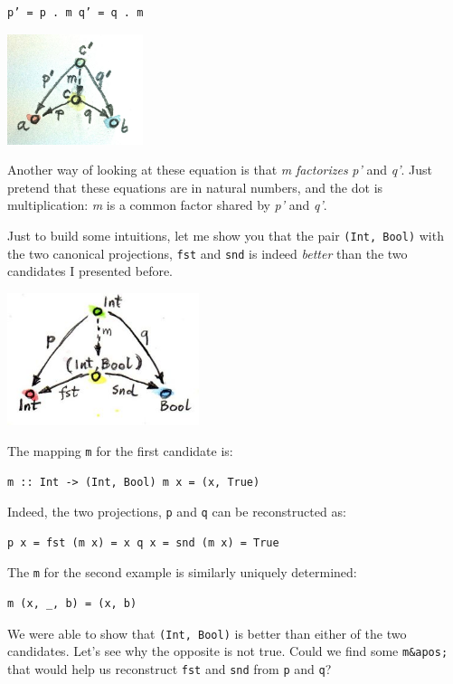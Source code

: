 \begin{verbatim}
p’ = p . m q’ = q . m
\end{verbatim}

\includegraphics[width=1.56250in]{images/productranking.jpg}

Another way of looking at these equation is that \emph{m}
\emph{factorizes} \emph{p'} and \emph{q'}. Just pretend that these
equations are in natural numbers, and the dot is multiplication:
\emph{m} is a common factor shared by \emph{p'} and \emph{q'}.

Just to build some intuitions, let me show you that the pair
\texttt{(Int,\ Bool)} with the two canonical projections, \texttt{fst}
and \texttt{snd} is indeed \emph{better} than the two candidates I
presented before.

\includegraphics[width=2.20833in]{images/not-a-product.jpg}

The mapping \texttt{m} for the first candidate is:

\begin{verbatim}
m :: Int -> (Int, Bool) m x = (x, True)
\end{verbatim}

Indeed, the two projections, \texttt{p} and \texttt{q} can be
reconstructed as:

\begin{verbatim}
p x = fst (m x) = x q x = snd (m x) = True
\end{verbatim}

The \texttt{m} for the second example is similarly uniquely determined:

\begin{verbatim}
m (x, _, b) = (x, b)
\end{verbatim}

We were able to show that \texttt{(Int,\ Bool)} is better than either of
the two candidates. Let's see why the opposite is not true. Could we
find some \texttt{m\&apos;} that would help us reconstruct \texttt{fst}
and \texttt{snd} from \texttt{p} and \texttt{q}?

